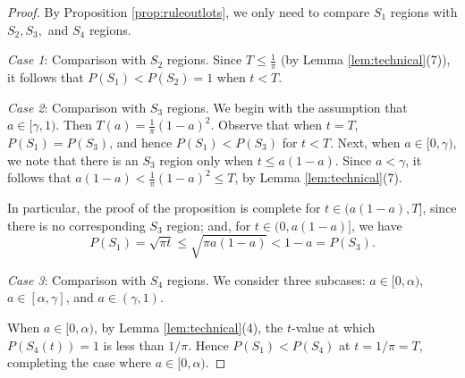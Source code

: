 \documentclass[leqno]{article}
\numberwithin{equation}{section}
\theoremstyle{definition}
\theoremstyle{remark}
\theoremstyle{plain}
\begin{document}
\begin{proof}

By Proposition \ref{prop:ruleoutlots}, we only need to compare $S_1$ regions with $S_2,S_3,$ and $S_4$ regions.  

\textit{Case 1}: Comparison with $S_2$ regions. Since $T\leq \frac{1}{\pi}$ (by Lemma \ref{lem:technical}(7)), it follows that $P(S_1) < P(S_2) = 1$ when $t<T$.

\textit{Case 2}: Comparison with $S_3$ regions.  We begin with the assumption that $a\in [\gamma,1)$.  Then $T(a) = \frac{1}{\pi}{(1-a)^2}$.  Observe that when $t= T$, $P(S_1) = P(S_3)$, and hence $P(S_1) < P(S_3)$ for $t < T$.  Next, when $a\in [0,\gamma)$, we note that there is an $S_3$ region only when $t\leq a(1-a)$.  Since $a< \gamma$, it follows that $a(1-a) < \frac{1}{\pi}(1-a)^2\leq T$, by Lemma \ref{lem:technical}(7). 

In particular, the proof of the proposition is complete for $t\in (a(1-a), T]$, since there is no corresponding $S_3$ region; and, for $t\in(0, a(1-a)]$, we have $$P(S_1) = \sqrt{\pi t}  \leq \sqrt{\pi a(1-a)} <  1-a = P(S_3).$$

\textit{Case 3}: Comparison with $S_4$ regions. We consider three subcases:  $a\in[0,\alpha)$, $a\in[\alpha,\gamma]$, and $a\in (\gamma,1)$.  

When $a\in [0,\alpha)$, by Lemma \ref{lem:technical}(4), the $t$-value at which $P(S_4(t)) = 1$ is less than $1/\pi$. Hence $P(S_1) < P(S_4)$ at $t = 1/\pi = T$, completing the case where $a\in [0,\alpha)$.


\end{proof}
\end{document}

